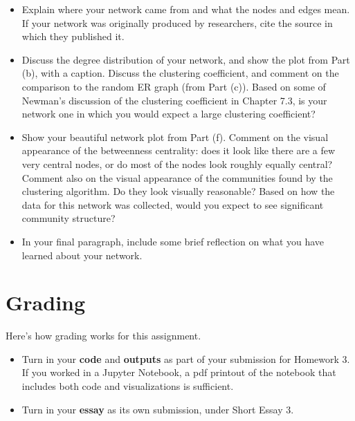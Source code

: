\documentclass{hw}
\begin{document}
\begin{itemize}
    \item Explain where your network came from and what the nodes and edges mean. 
    If your network was originally produced by researchers, cite the source in which they published it. 
    \item Discuss the degree distribution of your network, and show the plot from Part (b), with a caption. 
    Discuss the clustering coefficient, and comment on the comparison to the random ER graph (from Part (c)). 
    Based on some of Newman's discussion of the clustering coefficient in Chapter 7.3, is your network one in which you would expect a large clustering coefficient? 
    \item Show your beautiful network plot from Part (f). 
    Comment on the visual appearance of the betweenness centrality: does it look like there are a few very central nodes, or do most of the nodes look roughly equally central? 
    Comment also on the visual appearance of the communities found by the clustering algorithm. 
    Do they look visually reasonable? 
    Based on how the data for this network was collected, would you expect to see significant community structure? 
    \item In your final paragraph, include some brief reflection on what you have learned about your network. 
\end{itemize}


\section*{Grading}

Here's how grading works for this assignment. 
\begin{itemize}
    \item Turn in your \textbf{code} and \textbf{outputs} as part of your submission for Homework 3. 
    If you worked in a Jupyter Notebook, a pdf printout of the notebook that includes both code and visualizations is sufficient. 
    \item Turn in your \textbf{essay} as its own submission, under Short Essay 3. 
\end{itemize}
\end{document}
